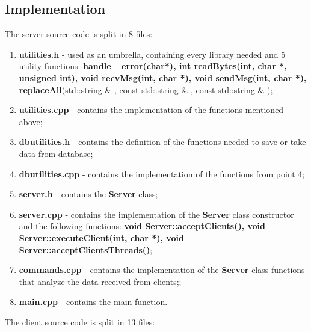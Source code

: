 \documentclass[runningheads]{llncs}
\begin{document}
\subsection{Implementation}
\par The server source code is split in 8 files:
\begin{enumerate}
\item \textbf{utilities.h} - used as an umbrella, containing every library needed and 5 utility functions: \textbf{handle\_ error(char*), int readBytes(int, char *, unsigned int), void recvMsg(int, char *), void sendMsg(int, char *), replaceAll}(std::string \& , const std::string \& , const std::string \& );
\item \textbf{utilities.cpp} - contains the implementation of the functions mentioned above;
\item \textbf{dbutilities.h} - contains the definition of the functions needed to save or take data from database;
\item \textbf{dbutilities.cpp} - contains the implementation of the functions from point 4;
\item \textbf{server.h} - contains the \textbf{Server} class;
\item \textbf{server.cpp} - contains the implementation of the \textbf{Server} class constructor and the following functions: \textbf{ void Server::acceptClients(), void Server::executeClient(int, char *), void Server::acceptClientsThreads()};
\item \textbf{commands.cpp} - contains the implementation of the \textbf{Server} class functions that analyze the data received from clients;;
\item \textbf{main.cpp} - contains the main function.
\end{enumerate}

\par The client source code is split in 13 files:
\end{document}
